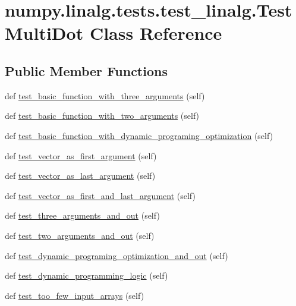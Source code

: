 \hypertarget{classnumpy_1_1linalg_1_1tests_1_1test__linalg_1_1TestMultiDot}{}\section{numpy.\+linalg.\+tests.\+test\+\_\+linalg.\+Test\+Multi\+Dot Class Reference}
\label{classnumpy_1_1linalg_1_1tests_1_1test__linalg_1_1TestMultiDot}
\subsection*{Public Member Functions}
\begin{DoxyCompactItemize}
\item 
def \hyperlink{classnumpy_1_1linalg_1_1tests_1_1test__linalg_1_1TestMultiDot_af6472b167c271a2a2d299c56abde2849}{test\+\_\+basic\+\_\+function\+\_\+with\+\_\+three\+\_\+arguments} (self)
\item 
def \hyperlink{classnumpy_1_1linalg_1_1tests_1_1test__linalg_1_1TestMultiDot_ad6a563178318350587154ddd59fbff5f}{test\+\_\+basic\+\_\+function\+\_\+with\+\_\+two\+\_\+arguments} (self)
\item 
def \hyperlink{classnumpy_1_1linalg_1_1tests_1_1test__linalg_1_1TestMultiDot_a9fd6044574a99425c2b955f05c03959e}{test\+\_\+basic\+\_\+function\+\_\+with\+\_\+dynamic\+\_\+programing\+\_\+optimization} (self)
\item 
def \hyperlink{classnumpy_1_1linalg_1_1tests_1_1test__linalg_1_1TestMultiDot_a5d416ad83eabdd2cc86adc5ab39f0b11}{test\+\_\+vector\+\_\+as\+\_\+first\+\_\+argument} (self)
\item 
def \hyperlink{classnumpy_1_1linalg_1_1tests_1_1test__linalg_1_1TestMultiDot_a47f99fe69d36edcd6e3a66952530436c}{test\+\_\+vector\+\_\+as\+\_\+last\+\_\+argument} (self)
\item 
def \hyperlink{classnumpy_1_1linalg_1_1tests_1_1test__linalg_1_1TestMultiDot_a19a92fa7b23513fa09a30cd806368daa}{test\+\_\+vector\+\_\+as\+\_\+first\+\_\+and\+\_\+last\+\_\+argument} (self)
\item 
def \hyperlink{classnumpy_1_1linalg_1_1tests_1_1test__linalg_1_1TestMultiDot_aae33ae909b74bd71b962246f6e29729a}{test\+\_\+three\+\_\+arguments\+\_\+and\+\_\+out} (self)
\item 
def \hyperlink{classnumpy_1_1linalg_1_1tests_1_1test__linalg_1_1TestMultiDot_afe029d8053a7a9e8b80e27d838e7eafb}{test\+\_\+two\+\_\+arguments\+\_\+and\+\_\+out} (self)
\item 
def \hyperlink{classnumpy_1_1linalg_1_1tests_1_1test__linalg_1_1TestMultiDot_a907956c7cb91604cf6306a5f498f41e7}{test\+\_\+dynamic\+\_\+programing\+\_\+optimization\+\_\+and\+\_\+out} (self)
\item 
def \hyperlink{classnumpy_1_1linalg_1_1tests_1_1test__linalg_1_1TestMultiDot_acab9713359ebe5fd82fc093db0e20498}{test\+\_\+dynamic\+\_\+programming\+\_\+logic} (self)
\item 
def \hyperlink{classnumpy_1_1linalg_1_1tests_1_1test__linalg_1_1TestMultiDot_a9ebb085d3533c8a491c0f2cbbec1d254}{test\+\_\+too\+\_\+few\+\_\+input\+\_\+arrays} (self)
\end{DoxyCompactItemize}


